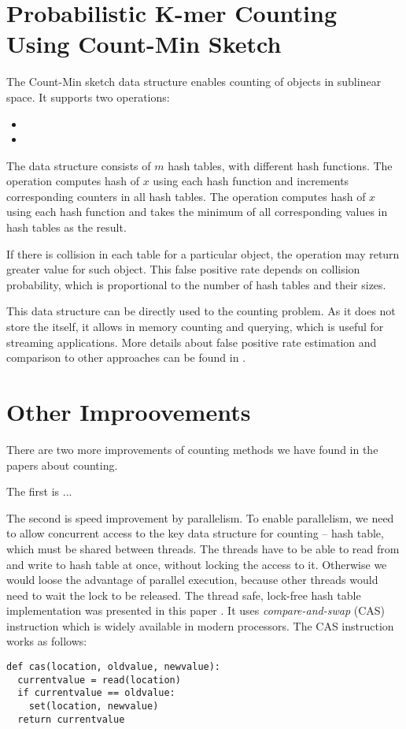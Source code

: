 \section{Probabilistic K-mer Counting Using Count-Min Sketch}

The Count-Min sketch\cite{countminsketch} data structure enables counting of objects in sublinear space. It supports two operations:
\begin{itemize}
  \item {}
  \item {}
\end{itemize}

The data structure consists of $m$ hash tables, with different hash functions.
The  operation computes hash of $x$ using each hash function and increments corresponding counters in all hash tables. The  operation computes hash of $x$ using each hash function and takes the minimum of all corresponding values in hash tables as the result.

If there is collision in each table for a particular object, the  operation may return greater value for such object. This false positive rate depends on collision probability, which is proportional to the number of hash tables and their sizes.

This data structure can be directly used to the \kmer counting problem. As it does not store the \kmers itself, it allows in memory \kmer counting and querying, which is useful for streaming applications.
More details about false positive rate estimation and comparison to other approaches can be found in \cite{khmer}.

\section{Other Improovements}

There are two more improvements of \kmer counting methods we have found in the papers about \kmer counting.

The first is ...

The second is speed improvement by parallelism. To enable parallelism, we need to allow concurrent access to the key data structure for \kmer counting -- hash table, which must be shared between threads. The threads have to be able to read from and write to hash table at once, without locking the access to it. Otherwise we would loose the advantage of parallel execution, because other threads would need to wait the lock to be released. The thread safe, lock-free hash table implementation was presented in this paper \cite{jellyfish}. It uses \emph{compare-and-swap} (CAS) instruction which is widely available in modern processors. The CAS instruction works as follows:
\begin{lstlisting}
def cas(location, oldvalue, newvalue):
  currentvalue = read(location)
  if currentvalue == oldvalue:
    set(location, newvalue)
  return currentvalue
\end{lstlisting}

